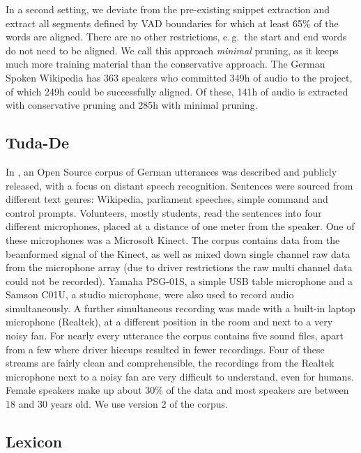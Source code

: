 \documentclass[a4paper]{article}
\begin{document}
In a second setting, we deviate from the pre-existing snippet
extraction and extract all segments defined by VAD boundaries for
which at least 65\% of the words are aligned. There are no other
restrictions, e.\,g.\ the start and end words do not need to be
aligned. We call this approach \emph{minimal} pruning, as it keeps
much more training material than the conservative approach. The 
German Spoken Wikipedia has 363 speakers who committed 349h of
audio to the project, of which 249h could be successfully aligned.
Of these, 141h of audio is extracted with conservative pruning and
285h with minimal pruning.






\subsection{Tuda-De}
\label{sec:tuda-de}

In \cite{radeck2015open}, an Open Source corpus of German utterances was described and publicly released, with a focus on distant speech recognition. Sentences were sourced from different text genres: Wikipedia, parliament speeches, simple command and control prompts. Volunteers, mostly students, read the sentences into four different microphones, placed at a distance of one meter from the speaker. One of these microphones was a Microsoft Kinect. The corpus contains data from the beamformed signal of the Kinect, as well as mixed down single channel raw data from the microphone array (due to driver restrictions the raw multi channel data could not be recorded). Yamaha PSG-01S, a simple USB table microphone and a Samson C01U, a studio microphone, were also used to record audio simultaneously. A further simultaneous recording was made with a
built-in laptop microphone (Realtek), at a different position in the room and next to a very noisy fan. For nearly every utterance the corpus contains five sound files, apart from a few where driver hiccups resulted in fewer recordings. Four of these streams are fairly clean and comprehensible, the recordings from the Realtek microphone next to a noisy fan are very difficult to understand, even for humans. Female speakers make up about 30\%
of the data and most speakers are between 18 and 30 years old. We use version 2 of the corpus.

\subsection{Lexicon}
\label{sec:lexicon}
\end{document}
